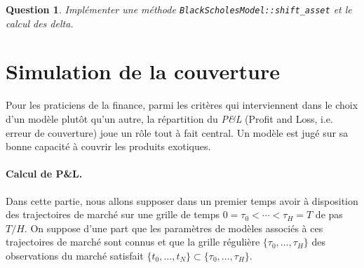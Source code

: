 \documentclass[a4paper,11pt]{article}
\def\var#1{{\tt #1}}
\newtheorem{question}{Question}
\begin{document}

\begin{question}
  Implémenter une méthode \var{BlackScholesModel::shift\_asset} et le calcul des delta.
\end{question}


\section{Simulation de la couverture}
\label{couverture}

Pour les praticiens de la finance, parmi les critères qui interviennent dans le choix d'un modèle plutôt qu'un autre, la répartition du {\it P\&L} (Profit and Loss, i.e. erreur de couverture) joue un rôle tout à fait central. Un modèle est jugé sur sa bonne capacité à couvrir les produits exotiques.

\paragraph{Calcul de P\&L.}

Dans cette partie, nous allons supposer dans un premier temps avoir à disposition des trajectoires de marché sur une grille de temps $0 = \tau_0 < \cdots < \tau_H = T$ de pas $T/H$. On suppose d'une part que les paramètres de modèles associés à ces trajectoires de marché sont connus et que la grille régulière $\{\tau_0, \dots, \tau_H \}$ des observations du marché satisfait $\{t_0, \dots, t_N\} \subset \{\tau_0, \dots, \tau_H \}$.
\end{document}
